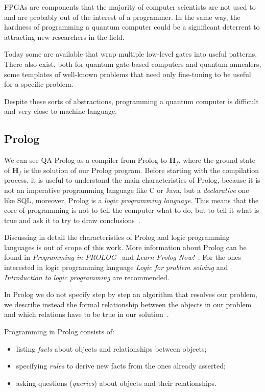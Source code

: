 FPGAs are components that the majority of computer scientists are not used to and are probably out of the interest of a programmer. In the same way, the hardness of programming a quantum computer could be a significant deterrent to attracting new researchers in the field.

Today some  are available that wrap multiple low-level gates into useful patterns. There also exist, both for quantum gate-based computers and quantum annealers, some templates of well-known problems that need only fine-tuning to be useful for a specific problem. 

Despite these sorts of abstractions, programming a quantum computer is difficult and very close to machine language.

\subsection{Prolog}
We can see QA-Prolog as a compiler from Prolog to $\mathbf{H}_f$, where the ground state of $\mathbf{H}_f$ is the solution of our Prolog program. Before starting with the compilation process, it is useful to understand the main characteristics of Prolog, because it is not an imperative programming language like C or Java, but a \emph{declarative} one like SQL, moreover, Prolog is a \emph{logic programming language}. This means that the core of programming is not to tell the computer what to do, but to tell it what is true and ask it to try to draw conclusions~\cite{clocksin2003programming}. 

Discussing in detail the characteristics of Prolog and logic programming languages is out of scope of this work. More information about Prolog can be found in  \emph{Programming in PROLOG}~\cite{clocksin2003programming} and \emph{Learn Prolog Now!}~\cite{learn_prolog_now_online}. For the ones interested in logic programming language \emph{Logic for problem solving}\cite{kowalski1982logic} and \emph{Introduction to logic programming}\cite{hogger1984introduction} are recommended.

In Prolog we do not specify step by step an algorithm that resolves our problem, we describe instead the formal relationship between the objects in our problem and which relations have to be true in our solution~\cite{clocksin2003programming}.

Programming in Prolog consists of:
\begin{itemize}
	\item listing \emph{facts} about objects and relationships between objects;
	\item specifying \emph{rules} to derive new facts from the ones already asserted;
	\item asking questions (\emph{queries}) about objects and their relationships.
\end{itemize}

